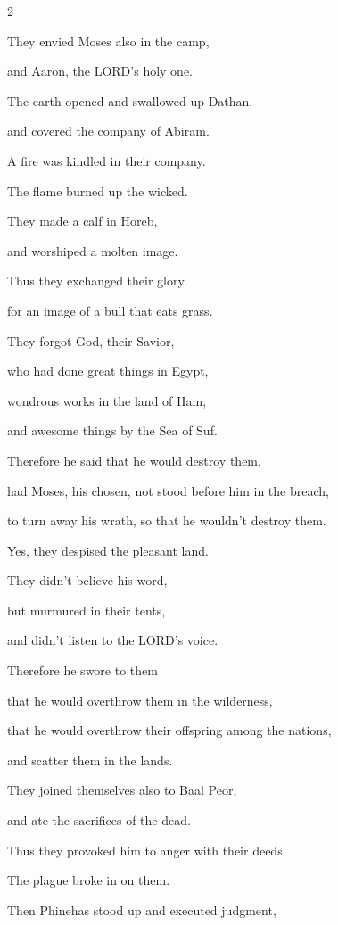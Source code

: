 \begin{multicols}{2}
	
	\myverse{}They envied Moses also in the camp,
	
	and Aaron, the LORD’s holy one.
	
	
	\myverse{}The earth opened and swallowed up Dathan,
	
	and covered the company of Abiram.
	
	
	\myverse{}A fire was kindled in their company.
	
	The flame burned up the wicked.
	
	
	\myverse{}They made a calf in Horeb,
	
	and worshiped a molten image.
	
	
	\myverse{}Thus they exchanged their glory
	
	for an image of a bull that eats grass.
	
	
	\myverse{}They forgot God, their Savior,
	
	who had done great things in Egypt,
	
	
	\myverse{}wondrous works in the land of Ham,
	
	and awesome things by the Sea of Suf.
	
	
	\myverse{}Therefore he said that he would destroy them,
	
	had Moses, his chosen, not stood before him in the breach,
	
	to turn away his wrath, so that he wouldn’t destroy them.
	
	
	\myverse{}Yes, they despised the pleasant land.
	
	They didn’t believe his word,
	
	
	\myverse{}but murmured in their tents,
	
	and didn’t listen to the LORD’s voice.
	
	
	\myverse{}Therefore he swore to them
	
	that he would overthrow them in the wilderness,
	
	
	\myverse{}that he would overthrow their offspring among the
	nations,
	
	and scatter them in the lands.
	
	
	\myverse{}They joined themselves also to Baal Peor,
	
	and ate the sacrifices of the dead.
	
	
	\myverse{}Thus they provoked him to anger with their deeds.
	
	The plague broke in on them.
	
	
	\myverse{}Then Phinehas stood up and executed judgment,
	

\end{multicols}
